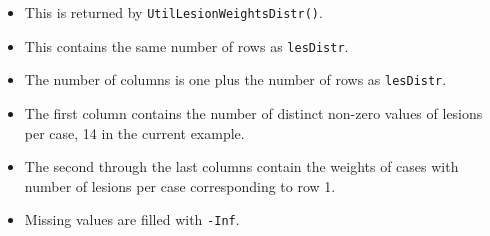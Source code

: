 \documentclass[
]{book}
\providecommand{\tightlist}{%
  \setlength{\itemsep}{0pt}\setlength{\parskip}{0pt}}
\begin{document}
\begin{itemize}
\tightlist
\item
  This is returned by \texttt{UtilLesionWeightsDistr()}.
\item
  This contains the same number of rows as \texttt{lesDistr}.
\item
  The number of columns is one plus the number of rows as \texttt{lesDistr}.
\item
  The first column contains the number of distinct non-zero values of lesions per case, 14 in the current example.
\item
  The second through the last columns contain the weights of cases with number of lesions per case corresponding to row 1.
\item
  Missing values are filled with \texttt{-Inf}.
\end{itemize}
\end{document}
